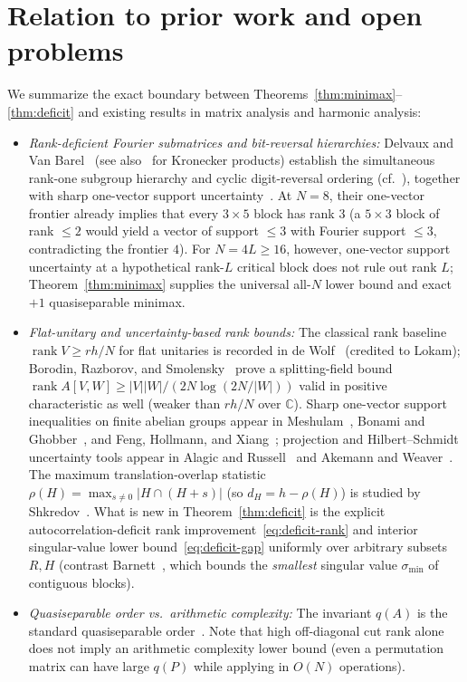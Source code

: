 \documentclass[11pt,reqno]{amsart}
\numberwithin{equation}{section}
\theoremstyle{definition}
\theoremstyle{remark}
\newcommand{\C}{\mathbb{C}}
\newcommand{\rank}{\operatorname{rank}}
\begin{document}
\section{Relation to prior work and open problems}
\label{sec:prior}

We summarize the exact boundary between Theorems~\ref{thm:minimax}--\ref{thm:deficit} and existing results in matrix analysis and harmonic analysis:
\begin{itemize}[leftmargin=1.5em]
\item \emph{Rank-deficient Fourier submatrices and bit-reversal hierarchies:} Delvaux and Van Barel~\cite{DV08} (see also~\cite{DV07} for Kronecker products) establish the simultaneous rank-one subgroup hierarchy and cyclic digit-reversal ordering (cf.~\cite[Eq.~(15) and Lemma~7]{DV08}), together with sharp one-vector support uncertainty~\cite[Theorem~9 and Remark~10]{DV08}. At $N=8$, their one-vector frontier already implies that every $3\times 5$ block has rank $3$ (a $5\times 3$ block of rank $\le 2$ would yield a vector of support $\le 3$ with Fourier support $\le 3$, contradicting the frontier $4$). For $N=4L\ge 16$, however, one-vector support uncertainty at a hypothetical rank-$L$ critical block does not rule out rank $L$; Theorem~\ref{thm:minimax} supplies the universal all-$N$ lower bound and exact $+1$ quasiseparable minimax.
\item \emph{Flat-unitary and uncertainty-based rank bounds:} The classical rank baseline $\rank V\ge rh/N$ for flat unitaries is recorded in de Wolf~\cite[Theorem~1]{deW06} (credited to Lokam); Borodin, Razborov, and Smolensky~\cite[Theorem~10]{BRS93} prove a splitting-field bound $\rank A[V,W]\ge |V||W|/(2N\log(2N/|W|))$ valid in positive characteristic as well (weaker than $rh/N$ over $\C$). Sharp one-vector support inequalities on finite abelian groups appear in Meshulam~\cite{Mes06}, Bonami and Ghobber~\cite{BG13}, and Feng, Hollmann, and Xiang~\cite{FHX18}; projection and Hilbert--Schmidt uncertainty tools appear in Alagic and Russell~\cite{AR08} and Akemann and Weaver~\cite{AW15}. The maximum translation-overlap statistic $\rho(H)=\max_{s\neq 0}|H\cap(H+s)|$ (so $d_H=h-\rho(H)$) is studied by Shkredov~\cite[Eq.~(4)]{Shk24}. What is new in Theorem~\ref{thm:deficit} is the explicit autocorrelation-deficit rank improvement~\eqref{eq:deficit-rank} and interior singular-value lower bound~\eqref{eq:deficit-gap} uniformly over arbitrary subsets $R,H$ (contrast Barnett~\cite{Bar20}, which bounds the \emph{smallest} singular value $\sigma_{\min}$ of contiguous blocks).
\item \emph{Quasiseparable order vs.\ arithmetic complexity:} The invariant $q(A)$ is the standard quasiseparable order~\cite{PSV23}. Note that high off-diagonal cut rank alone does not imply an arithmetic complexity lower bound (even a permutation matrix can have large $q(P)$ while applying in $O(N)$ operations).
\end{itemize}
\end{document}
